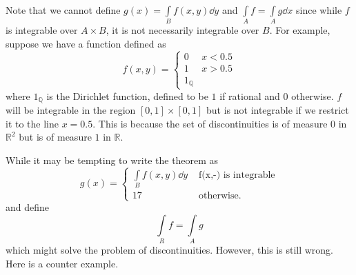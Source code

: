 \documentclass{article}
\begin{document}
\begin{warning}
    Note that we cannot define $g(x) = \int\limits_{B} f(x,y) \dd{y}$ and $\int\limits_A f = \int\limits_A g \dd{x}$ since while $f$ is integrable over $A\times B$, it is not necessarily integrable over $B$. For example, suppose we have a function defined as
    \begin{equation}
        f(x,y) = \begin{cases}
            0 & x < 0.5 \\
            1 & x > 0.5 \\
            1_{\mathbb{Q}}
        \end{cases}
    \end{equation}
    where $1_{\mathbb{Q}}$ is the Dirichlet function, defined to be $1$ if rational and $0$ otherwise. $f$ will be integrable in the region $[0,1]\times [0,1]$ but is not integrable if we restrict it to the line $x=0.5.$ This is because the set of discontinuities is of measure $0$ in $\mathbb{R}^2$ but is of measure $1$ in $\mathbb{R}$.
\end{warning}
While it may be tempting to write the theorem as
\begin{equation}
    g(x) = \begin{cases}
        \int\limits_B f(x,y) \dd{y} & \text{ f(x,-) is integrable} \\
        17                          & \text{ otherwise}.
    \end{cases}
\end{equation}
and define
\begin{equation}
    \int\limits_R f = \int\limits_A g
\end{equation}
which might solve the problem of discontinuities. However, this is still wrong. Here is a counter example.
\end{document}
